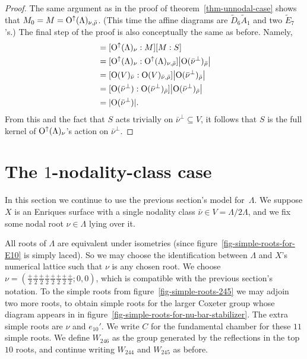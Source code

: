 \documentclass[12pt]{amsart}
\def\Orth{{\rm O}}
\def\Oup{\Orth^{\uparrow}}
\def\nubar{{\bar{\nu}}}
\def\rhobar{{\bar{\rho}}}
\def\Atilde{\widetilde{A}}
\def\Dtilde{\widetilde{D}}
\def\Etilde{\widetilde{E}}
\def\sset{\subseteq}
\numberwithin{theorem}{section}
\numberwithin{equation}{section}
\numberwithin{figure}{section}
\theoremstyle{remark}
\begin{document}
\begin{proof}
The same argument as in the proof of theorem~\ref{thm-unnodal-case} shows that
$M_0=M=\Oup(\Lambda)_{\nu,\rhobar}$.  (This time the affine diagrams
are $\Dtilde_6\Atilde_1$ and two $\Etilde_7$'s.)
The final step of the proof is also conceptually the same as before.  Namely,
\begin{align*}
  [\Oup(\Lambda)_\nu:S]
  &{}=
  [\Oup(\Lambda)_\nu:M][M:S]
  \\
  &{}=[\Oup(\Lambda)_\nu:\Oup(\Lambda)_{\nu,\rhobar}]\bigl|\Orth(\nubar^\perp)_{\rhobar}\bigr|
  \\
  &{}=[\Orth(V)_\nubar:\Orth(V)_{\nubar,\rhobar}]\bigl|\Orth(\nubar^\perp)_{\rhobar}\bigr|
  \\
  &{}=[\Orth(\nubar^\perp):\Orth(\nubar^\perp)_{\rhobar}]\bigl|\Orth(\nubar^\perp)_{\rhobar}\bigr|
  \\
  &{}=|\Orth(\nubar^\perp)|.
\end{align*}
From this and the fact that $S$ acts trivially on $\nubar^\perp\sset
V$, it follows that $S$ is the full kernel  of
$\Oup(\Lambda)_\nu$'s action  on $\nubar^\perp$.
\end{proof}

\section{The $1$-nodality-class case}
\label{sec-1-nodal}

\noindent
In this section we continue to use the previous section's model for~$\Lambda$.  We suppose $X$ is an Enriques surface with a single nodality
class $\nubar\in V=\Lambda/2\Lambda$, and we fix some nodal root
$\nu\in\Lambda$ lying over it.

All roots of $\Lambda$ are equivalent under isometries (since
figure~\ref{fig-simple-roots-for-E10} is simply laced). So we may choose the identification
between $\Lambda$ and $X$'s numerical lattice such that $\nu$ is any
chosen root.  We choose
$\nu=(\frac+2\frac+2\frac+2\frac+2\frac+2\frac+2\frac+2\frac+2;0,0)$,
which is compatible with the previous section's notation.  To the simple roots from
figure~\ref{fig-simple-roots-245} we may adjoin two more roots, to
obtain simple roots for the larger Coxeter group  whose diagram appears
in in figure~\ref{fig-simple-roots-for-nu-bar-stabilizer}.  The extra simple roots are $\nu$ and $e_{10}'$.
We write $C$ for the fundamental chamber for these $11$ simple roots.
We define $W_{246}$ as the group generated by the reflections in the
top~$10$ roots, and continue writing $W_{244}$ and $W_{245}$ as
before.
\end{document}
